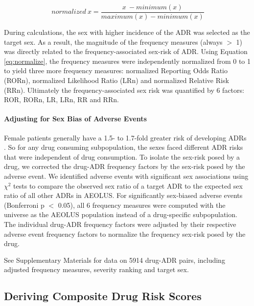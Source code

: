 \documentclass[11pt, oneside]{article}
\begin{document}

\begin{equation} \label{eq:normalize}\
	normalized\ x = \frac{x\ - minimum(x)}{maximum(x) - minimum(x)}
\end{equation} 

During calculations, the sex with higher incidence of the ADR was selected as the target sex. As a result, the magnitude of the frequency measures (always $>$ 1) was directly related to the frequency-associated sex-risk of ADR. Using Equation \ref{eq:normalize}, the frequency measures were independently normalized from 0 to 1 to yield three more frequency measures: normalized Reporting Odds Ratio (RORn), normalized Likelihood Ratio (LRn) and normalized Relative Risk (RRn). Ultimately the frequency-associated sex risk was quantified by 6 factors: ROR, RORn, LR, LRn, RR and RRn. 

\paragraph{Adjusting for Sex Bias of Adverse Events}

Female patients generally have a 1.5- to 1.7-fold greater risk of developing  ADRs \cite{rademaker_women_2001,stabile_gender_2014}. So for any drug consuming subpopulation, the sexes faced different ADR risks that were independent of drug consumption. To isolate the sex-risk posed by a drug, we corrected the drug-ADR frequency factors by the sex-risk posed by the adverse event. We identified adverse events with significant sex associations using $\chi^2$ tests to compare the observed sex ratio of a target ADR to the expected sex ratio of all other ADRs in AEOLUS. For significantly sex-biased adverse events (Bonferroni p $<$ 0.05), all 6 frequency measures were computed with the universe as the AEOLUS population instead of a drug-specific subpopulation. The individual drug-ADR frequency factors were adjusted by their respective adverse event frequency factors to normalize the frequency sex-risk posed by the drug. 

See Supplementary Materials for data on 5914 drug-ADR pairs, including adjusted frequency measures, severity ranking and target sex.

\subsection{Deriving Composite Drug Risk Scores}
\end{document}
